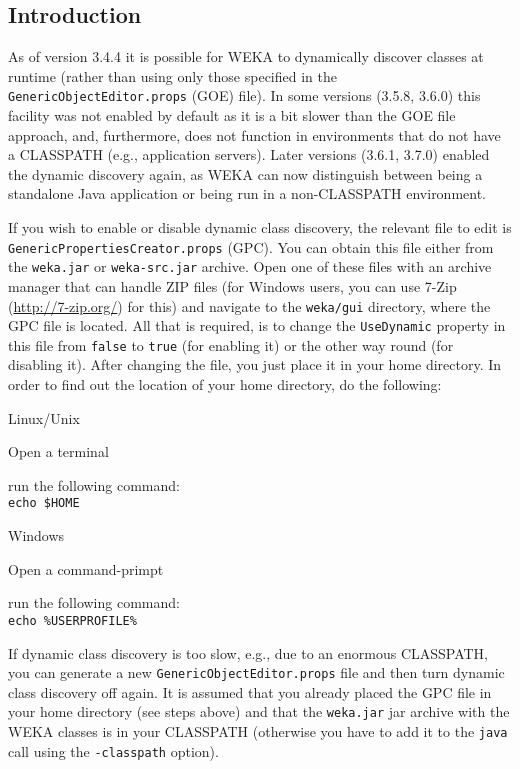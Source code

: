 \subsection{Introduction}
As of version 3.4.4 it is possible for WEKA to dynamically discover
classes at runtime (rather than using only those specified in the
\verb=GenericObjectEditor.props= (GOE) file). In some versions 
(3.5.8, 3.6.0) this facility was not enabled by default as it is a bit slower
than the GOE file approach, and, furthermore, does not function in
environments that do not have a CLASSPATH (e.g., application servers). Later
versions (3.6.1, 3.7.0) enabled the dynamic discovery again, as WEKA can
now distinguish between being a standalone Java application or being run in a
non-CLASSPATH environment.

If you wish to enable or disable dynamic class discovery, the relevant file to
edit is \verb=GenericPropertiesCreator.props= (GPC). You can obtain this file
either from the \texttt{weka.jar} or \texttt{weka-src.jar} archive. Open one of
these files with an archive manager that can handle ZIP files (for Windows
users, you can use 7-Zip (\url{http://7-zip.org/}{}) for this) and
navigate to the \texttt{weka/gui} directory, where the GPC file is located. All
that is required, is to change the \verb=UseDynamic= property in this file from
\verb=false= to \verb=true= (for enabling it) or the other way round (for
disabling it). After changing the file, you just place it in your home
directory. In order to find out the location of your home directory,
do the following:
\begin{tight_itemize}
	\item Linux/Unix
		\begin{tight_itemize}
 			\item Open a terminal
			\item run the following command: \\
			\texttt{echo \$HOME}
		\end{tight_itemize}
	\item Windows
		\begin{tight_itemize}
 			\item Open a command-primpt
			\item run the following command: \\
			\texttt{echo \%USERPROFILE\%}
		\end{tight_itemize}
\end{tight_itemize}
If dynamic class discovery is too slow, e.g., due to an enormous CLASSPATH, you
can generate a new \verb=GenericObjectEditor.props= file and then turn dynamic
class discovery off again. It is assumed that you already placed the GPC file in
your home directory (see steps above) and that the \texttt{weka.jar} jar
archive with the WEKA classes is in your CLASSPATH (otherwise you have to add it
to the \texttt{java} call using the \texttt{-classpath} option). \\

